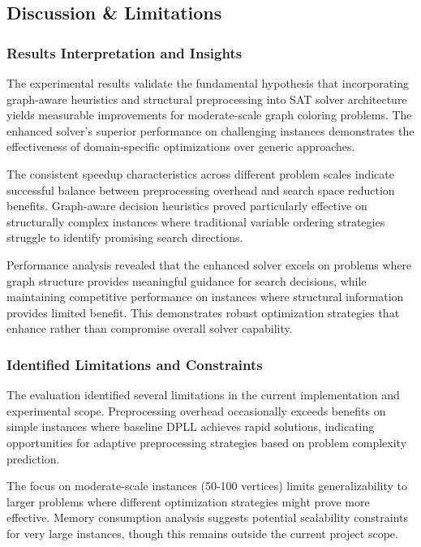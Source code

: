\subsection{Discussion \& Limitations}

\subsubsection{Results Interpretation and Insights}

The experimental results validate the fundamental hypothesis that incorporating graph-aware heuristics and structural preprocessing into SAT solver architecture yields measurable improvements for moderate-scale graph coloring problems. The enhanced solver's superior performance on challenging instances demonstrates the effectiveness of domain-specific optimizations over generic approaches.

The consistent speedup characteristics across different problem scales indicate successful balance between preprocessing overhead and search space reduction benefits. Graph-aware decision heuristics proved particularly effective on structurally complex instances where traditional variable ordering strategies struggle to identify promising search directions.

Performance analysis revealed that the enhanced solver excels on problems where graph structure provides meaningful guidance for search decisions, while maintaining competitive performance on instances where structural information provides limited benefit. This demonstrates robust optimization strategies that enhance rather than compromise overall solver capability.

\subsubsection{Identified Limitations and Constraints}

The evaluation identified several limitations in the current implementation and experimental scope. Preprocessing overhead occasionally exceeds benefits on simple instances where baseline DPLL achieves rapid solutions, indicating opportunities for adaptive preprocessing strategies based on problem complexity prediction.

The focus on moderate-scale instances (50-100 vertices) limits generalizability to larger problems where different optimization strategies might prove more effective. Memory consumption analysis suggests potential scalability constraints for very large instances, though this remains outside the current project scope.

